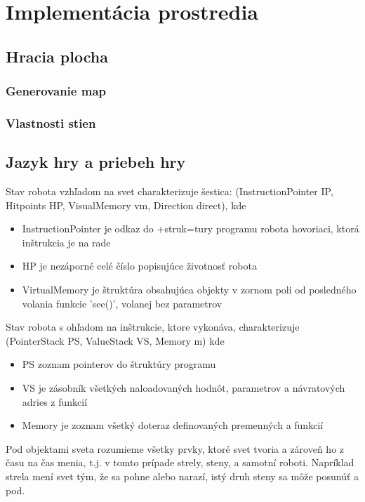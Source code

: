 \chapter{Implementácia prostredia}
\section{Hracia plocha} %
\subsection{Generovanie map}%
\subsection{Vlastnosti stien} %
\section{Jazyk hry a priebeh hry} %

\begin{definicia}
Stav robota vzhľadom na svet charakterizuje šestica: (InstructionPointer IP, Hitpoints HP, VisualMemory vm, Direction direct), kde 
\begin{itemize}
\item InstructionPointer je odkaz do +struk=tury programu robota hovoriaci, ktorá inštrukcia je na rade
\item HP je nezáporné celé číslo popisujúce životnosť robota
\item VirtualMemory je štruktúra obsahujúca objekty v zornom poli od posledného volania funkcie 'see()', volanej bez parametrov 
\end{itemize}
Stav robota s ohľadom na inštrukcie, ktore vykonáva, charakterizuje (PointerStack PS, ValueStack VS, Memory m) kde
\begin{itemize}
\item PS zoznam pointerov do štruktúry programu
\item VS je zásobník všetkých naloadovaných hodnôt, parametrov  a návratových adries z funkcií
\item Memory je zoznam všetký doteraz definovaných premenných a funkcií
\end{itemize}
\end{definicia}

\begin{definicia} 
Pod objektami sveta rozumieme všetky prvky, ktoré svet tvoria a zároveň ho z času na čas menia, t.j. v tomto prípade strely, steny, a samotní roboti. Napríklad strela mení svet tým, že sa pohne alebo narazí, istý druh steny sa môže posunúť a pod.
\end{definicia}

